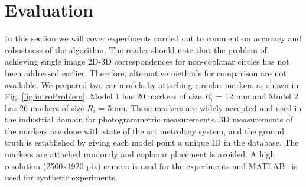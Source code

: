 \documentclass{bmvc2k}
\begin{document}

\section{Evaluation}
In this section we will cover experiments carried out to comment on accuracy and robustness of the algorithm. 
The reader should note that the problem of achieving single image 2D-3D correspondences for non-coplanar circles has not been addressed earlier. 
Therefore, alternative methods for comparison are not available. 
We prepared two car models by attaching circular markers as shown in Fig. \ref{fig:introProblem}.
Model 1 has 20 markers of size $ R_i $ = 12 mm and Model 2 has 26 markers of size $ R_i $ = 5mm. 
These markers are widely accepted and used in the industrial domain for photogrammetric measurements.     
3D measurements of the markers are done with state of the art metrology system, and the ground truth is established by giving each model point a unique ID in the database. 
The markers are attached randomly and coplanar placement is avoided. 
A high resolution (2560x1920 pix) camera is used for the experiments and MATLAB~\cite{MATLAB} is used for synthetic experiments. 
\end{document}
